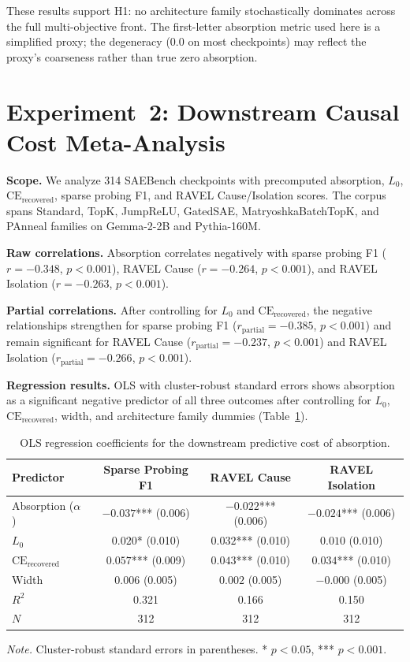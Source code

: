 \documentclass{article}
\begin{document}
These results support H1: no architecture family stochastically dominates across the full multi-objective front. The first-letter absorption metric used here is a simplified proxy; the degeneracy ($0.0$ on most checkpoints) may reflect the proxy's coarseness rather than true zero absorption.

\section{Experiment~2: Downstream Causal Cost Meta-Analysis}
\label{sec:exp2}

\textbf{Scope.} We analyze 314 SAEBench checkpoints with precomputed absorption, $L_0$, $\text{CE}_{\text{recovered}}$, sparse probing F1, and RAVEL Cause/Isolation scores. The corpus spans Standard, TopK, JumpReLU, GatedSAE, MatryoshkaBatchTopK, and PAnneal families on Gemma-2-2B and Pythia-160M.

\textbf{Raw correlations.} Absorption correlates negatively with sparse probing F1 ($r = -0.348$, $p < 0.001$), RAVEL Cause ($r = -0.264$, $p < 0.001$), and RAVEL Isolation ($r = -0.263$, $p < 0.001$).

\textbf{Partial correlations.} After controlling for $L_0$ and $\text{CE}_{\text{recovered}}$, the negative relationships strengthen for sparse probing F1 ($r_{\text{partial}} = -0.385$, $p < 0.001$) and remain significant for RAVEL Cause ($r_{\text{partial}} = -0.237$, $p < 0.001$) and RAVEL Isolation ($r_{\text{partial}} = -0.266$, $p < 0.001$).

\textbf{Regression results.} OLS with cluster-robust standard errors shows absorption as a significant negative predictor of all three outcomes after controlling for $L_0$, $\text{CE}_{\text{recovered}}$, width, and architecture family dummies (Table~\ref{tab:e2}).

\begin{table}[t]
\centering
\caption{OLS regression coefficients for the downstream predictive cost of absorption.}
\label{tab:e2}
\begin{tabular}{lccc}
\toprule
Predictor & Sparse Probing F1 & RAVEL Cause & RAVEL Isolation \\
\midrule
Absorption ($\alpha$) & $-0.037$*** (0.006) & $-0.022$*** (0.006) & $-0.024$*** (0.006) \\
$L_0$ & $0.020$* (0.010) & $0.032$*** (0.010) & $0.010$ (0.010) \\
$\text{CE}_{\text{recovered}}$ & $0.057$*** (0.009) & $0.043$*** (0.010) & $0.034$*** (0.010) \\
Width & $0.006$ (0.005) & $0.002$ (0.005) & $-0.000$ (0.005) \\
\midrule
$R^2$ & 0.321 & 0.166 & 0.150 \\
$N$ & 312 & 312 & 312 \\
\bottomrule
\end{tabular}
\begin{flushleft}
\small \textit{Note.} Cluster-robust standard errors in parentheses. * $p < 0.05$, *** $p < 0.001$.
\end{flushleft}
\end{table}
\end{document}
